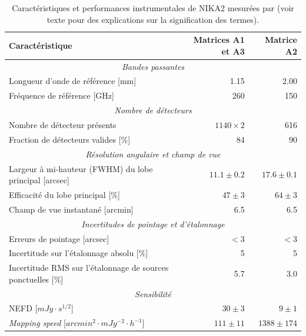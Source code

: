 \begin{table}[t]
    \setlength{\tabcolsep}{15pt}
    \small
    \centering
    \begin{tabular}{l r r}
        \toprule
        Caractéristique & Matrices A1 et A3 & Matrice A2 \\
        \midrule
        \midrule
        \multicolumn{3}{c}{\itshape Bandes passantes} \\
        \midrule
        Longueur d'onde de référence [mm]   & 1.15 & 2.00 \\
        Fréquence de référence [GHz]        & 260  & 150  \\
        \midrule
        \multicolumn{3}{c}{\itshape Nombre de détecteurs} \\
        \midrule
        Nombre de détecteur présents        & $1140 \times 2$ & 616 \\
        Fraction de détecteurs valides [\%] & 84 & 90 \\
        \midrule
        \multicolumn{3}{c}{\itshape Résolution angulaire et champ de vue} \\
        \midrule
        Largeur à mi-hauteur (FWHM) du lobe principal [arcsec] & $11.1 \pm 0.2$ & $17.6 \pm 0.1$ \\
        Efficacité du lobe principal [\%]   & $47 \pm 3$ & $64 \pm 3$ \\
        Champ de vue instantané [arcmin]    & 6.5 & 6.5 \\
        \midrule
        \multicolumn{3}{c}{\itshape Incertitudes de pointage et d'étalonnage} \\
        \midrule
        Erreurs de pointage [arcsec] & $<3$ & $<3$ \\
        Incertitude sur l'étalonnage absolu [\%] & 5 & 5 \\
        Incertitude RMS sur l'étalonnage de sources ponctuelles [\%] & 5.7 & 3.0 \\
        \midrule
        \multicolumn{3}{c}{\itshape Sensibilité} \\
        \midrule
        NEFD [$\unit{mJy \cdot s^{1/2}}$]  & $30 \pm 3$ & $9 \pm 1$ \\
        \textit{Mapping speed} [$\unit{arcmin^2 \cdot mJy^{-2} \cdot h^{-1}}$] & $111 \pm 11$ & $1388 \pm 174$ \\
        \bottomrule
    \end{tabular}
    \caption{%
        Caractéristiques et performances instrumentales de NIKA2 mesurées par  (voir texte pour des explications sur la signification des termes).
    }
    \label{tab:nk_specs}
\end{table}

